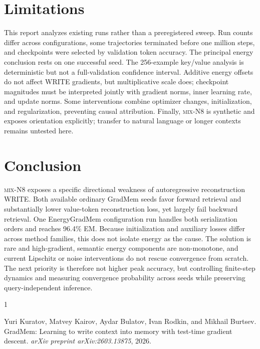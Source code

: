 \documentclass{article}
\newcommand{\dataset}{\textsc{mix-N8}}
\newcommand{\egm}{EnergyGradMem}
\newcommand{\gm}{GradMem}
\begin{document}
\section{Limitations}
\label{sec:limitations}

This report analyzes existing runs rather than a preregistered sweep.  Run counts differ across configurations, some trajectories terminated before one million steps, and checkpoints were selected by validation token accuracy.  The principal energy conclusion rests on one successful seed.  The 256-example key/value analysis is deterministic but not a full-validation confidence interval.  Additive energy offsets do not affect WRITE gradients, but multiplicative scale does; checkpoint magnitudes must be interpreted jointly with gradient norms, inner learning rate, and update norms.  Some interventions combine optimizer changes, initialization, and regularization, preventing causal attribution.  Finally, \dataset{} is synthetic and exposes orientation explicitly; transfer to natural language or longer contexts remains untested here.

\section{Conclusion}
\label{sec:conclusion}

\dataset{} exposes a specific directional weakness of autoregressive reconstruction WRITE.  Both available ordinary \gm{} seeds favor forward retrieval and substantially lower value-token reconstruction loss, yet largely fail backward retrieval.  One \egm{} configuration run handles both serialization orders and reaches 96.4\% EM.  Because initialization and auxiliary losses differ across method families, this does not isolate energy as the cause.  The solution is rare and high-gradient, semantic energy components are non-monotone, and current Lipschitz or noise interventions do not rescue convergence from scratch.  The next priority is therefore not higher peak accuracy, but controlling finite-step dynamics and measuring convergence probability across seeds while preserving query-independent inference.


\begin{thebibliography}{1}

Yuri Kuratov, Matvey Kairov, Aydar Bulatov, Ivan Rodkin, and Mikhail Burtsev.
\newblock GradMem: Learning to write context into memory with test-time gradient descent.
\newblock \emph{arXiv preprint arXiv:2603.13875}, 2026.

\end{thebibliography}
\end{document}
